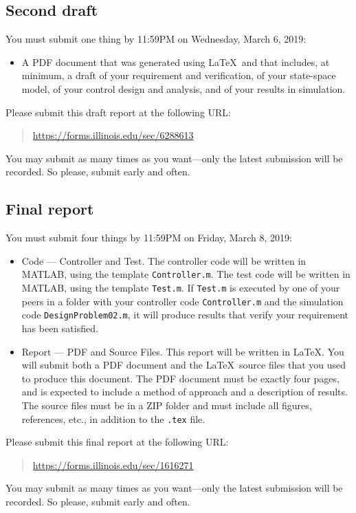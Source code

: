 \documentclass[12pt]{article}
\begin{document}
\subsection{Second draft}

You must submit one thing by 11:59PM on Wednesday, March 6, 2019:
\begin{itemize}
\item A PDF document that was generated using \LaTeX\ and that includes, at minimum, a draft of your requirement and verification, of your state-space model, of your control design and analysis, and of your results in simulation.
\end{itemize}
Please submit this draft report at the following URL:
\begin{quote}
\url{https://forms.illinois.edu/sec/6288613}
\end{quote}
You may submit as many times as you want---only the latest submission will be recorded. So please, submit early and often.

\subsection{Final report}

You must submit four things by 11:59PM on Friday, March 8, 2019:
\begin{itemize}

\item Code --- Controller and Test. The controller code will be written in MATLAB, using the template \lstinline!Controller.m!. The test code will be written in MATLAB, using the template \lstinline|Test.m|. If \lstinline|Test.m| is executed by one of your peers in a folder with your controller code \lstinline!Controller.m! and the simulation code \lstinline!DesignProblem02.m!, it will produce results that verify your requirement has been satisfied.

\item Report --- PDF and Source Files. This report will be written in \LaTeX. You will submit both a PDF document and the \LaTeX\ source files that you used to produce this document. The PDF document must be exactly four pages, and is expected to include a method of approach and a description of results. The source files must be in a ZIP folder and must include all figures, references, etc., in addition to the \lstinline!.tex! file.

\end{itemize}
Please submit this final report at the following URL:
\begin{quote}
\url{https://forms.illinois.edu/sec/1616271}
\end{quote}
You may submit as many times as you want---only the latest submission will be recorded. So please, submit early and often.
\end{document}
